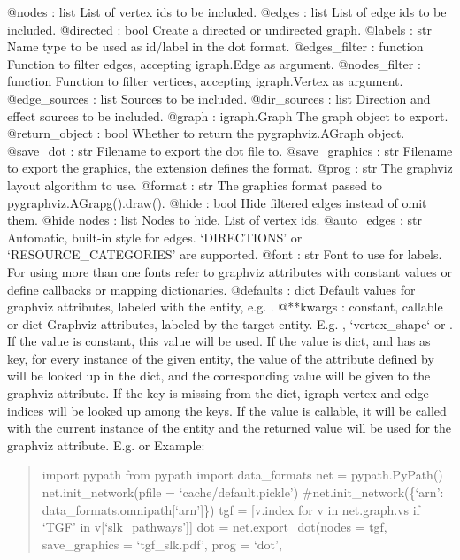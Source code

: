 \documentclass[letterpaper,10pt,english]{sphinxmanual}
\begin{document}
\begin{fulllineitems}
\begin{fulllineitems}
@nodes : list
List of vertex ids to be included.
@edges : list
List of edge ids to be included.
@directed : bool
Create a directed or undirected graph.
@labels : str
Name type to be used as id/label in the dot format.
@edges\_filter : function
Function to filter edges, accepting igraph.Edge as argument.
@nodes\_filter : function
Function to filter vertices, accepting igraph.Vertex as argument.
@edge\_sources : list
Sources to be included.
@dir\_sources : list
Direction and effect sources to be included.
@graph : igraph.Graph
The graph object to export.
@return\_object : bool
Whether to return the pygraphviz.AGraph object.
@save\_dot : str
Filename to export the dot file to.
@save\_graphics : str
Filename to export the graphics, the extension defines the format.
@prog : str
The graphviz layout algorithm to use.
@format : str
The graphics format passed to pygraphviz.AGrapg().draw().
@hide : bool
Hide filtered edges instead of omit them.
@hide nodes : list
Nodes to hide. List of vertex ids.
@auto\_edges : str
Automatic, built-in style for edges.
‘DIRECTIONS’ or ‘RESOURCE\_CATEGORIES’ are supported.
@font : str
Font to use for labels.
For using more than one fonts refer to graphviz attributes with constant values
or define callbacks or mapping dictionaries.
@defaults : dict
Default values for graphviz attributes, labeled with the entity, e.g.
.
@**kwargs : constant, callable or dict
Graphviz attributes, labeled by the target entity. E.g. ,
‘vertex\_shape{}` or .
If the value is constant, this value will be used.
If the value is dict, and has  as key, for every instance of the
given entity, the value of the attribute defined by  will be looked
up in the dict, and the corresponding value will be given to the graphviz
attribute. If the key  is missing from the dict, igraph vertex and
edge indices will be looked up among the keys.
If the value is callable, it will be called with the current instance of
the entity and the returned value will be used for the graphviz attribute.
E.g.  or 
Example:
\begin{quote}

import pypath
from pypath import data\_formats
net = pypath.PyPath()
net.init\_network(pfile = ‘cache/default.pickle’)
\#net.init\_network(\{‘arn’: data\_formats.omnipath{[}‘arn’{]}\})
tgf = {[}v.index for v in net.graph.vs if ‘TGF’ in v{[}‘slk\_pathways’{]}{]}
dot = net.export\_dot(nodes = tgf, save\_graphics = ‘tgf\_slk.pdf’, prog = ‘dot’,
\begin{quote}


\end{quote}
\end{quote}
\end{fulllineitems}
\end{fulllineitems}
\end{document}
